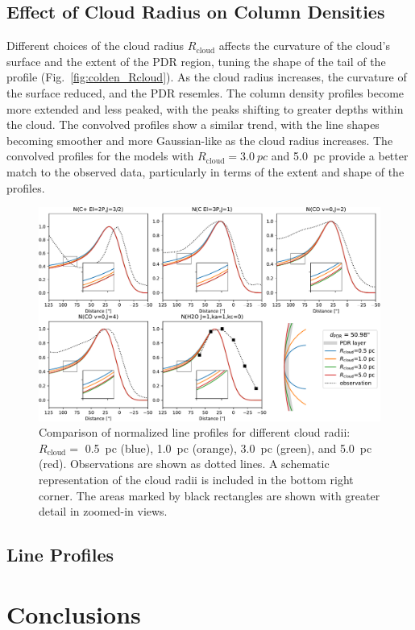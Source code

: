 \documentclass[12pt,a4paper]{article}
\newcommand{\mr}{\mathrm}
\begin{document}
\subsection{Effect of Cloud Radius on Column Densities}

Different choices of the cloud radius $R_\mr{cloud}$ affects the curvature of the cloud's surface and the extent of the PDR region, tuning the shape of the tail of the profile (Fig.~\ref{fig:colden_Rcloud}). As the cloud radius increases, the curvature of the surface reduced, and the PDR resemles. The column density profiles become more extended and less peaked, with the peaks shifting to greater depths within the cloud. The convolved profiles show a similar trend, with the line shapes becoming smoother and more Gaussian-like as the cloud radius increases. The convolved profiles for the models with $R_\mr{cloud} = \qty{3.0}{pc}$ and \qty{5.0}{pc} provide a better match to the observed data, particularly in terms of the extent and shape of the profiles.

\begin{figure}
    \centering
    \includegraphics[width=\textwidth,keepaspectratio]{comp_cloud_radius.pdf}
    \caption{Comparison of normalized line profiles for different cloud radii: $R_\mr{cloud} = $ \qty{0.5}{pc} (blue), \qty{1.0}{pc} (orange), \qty{3.0}{pc} (green), and \qty{5.0}{pc} (red). Observations are shown as dotted lines. A schematic representation of the cloud radii is included in the bottom right corner. The areas marked by black rectangles are shown with greater detail in zoomed-in views.} \label{fig:compcloudrad}
\end{figure}

\subsection{Line Profiles}

\section{Conclusions}

\newpage
\printbibliography

\newpage
\appendix
\end{document}
